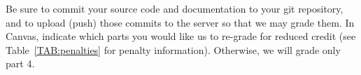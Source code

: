 \documentclass{article}
\newcommand{\codegen}{4}
\begin{document}
Be sure to commit your source code and documentation to your
git repository, and to upload (push) those commits to the server
so that we may grade them.
In Canvas,
indicate which parts you would like us to re-grade for reduced credit
(see Table~\ref{TAB:penalties} for penalty information).
Otherwise, we will grade only part \codegen.
\end{document}
